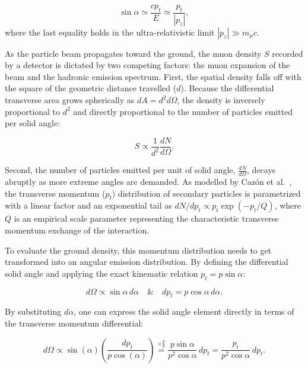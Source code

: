 \documentclass[11pt,a4paper]{article}
\begin{document}
\begin{equation}
    \sin \alpha \simeq \frac{c p_t}{E} \simeq \frac{p_t}{|p_z|},
    \label{eq:cazon_alpha}
\end{equation}
%
where the last equality holds in the ultra-relativistic limit $|p_z| \gg m_\mu c$.

As the particle beam propagates toward the ground, the muon density $S$ recorded by a detector is dictated by two competing factors: the muon expansion of the beam and the hadronic emission spectrum. First, the spatial density falls off with the square of the geometric distance travelled ($d$). Because the differential transverse area grows spherically as $dA = d^2 d\Omega$, the density is inversely proportional to $d^2$ and directly proportional to the number of particles emitted per solid angle:

\begin{equation}
    S \propto \frac{1}{d^2} \frac{dN}{d\Omega}.
\end{equation}

Second, the number of particles emitted per unit of solid angle, $\frac{dN}{d\Omega}$, decays abruptly as more extreme angles are demanded. As modelled by Cazón et al.~\cite{Cazon2012}, the transverse momentum ($p_t$) distribution of secondary particles is parametrized with a linear factor and an exponential tail as $dN/dp_t \propto p_t \exp(-p_t/Q)$, where $Q$ is an empirical scale parameter representing the characteristic transverse momentum exchange of the interaction.

To evaluate the ground density, this momentum distribution needs to get transformed into an angular emission distribution. By defining the differential solid angle and applying the exact kinematic relation $p_t = p \sin\alpha$:

\begin{equation}
    d\Omega \propto \sin\alpha \, d\alpha \quad \& \quad dp_t = p \cos\alpha \, d\alpha.
    \nonumber
\end{equation}

By substituting $d\alpha$, one can express the solid angle element directly in terms of the transverse momentum differential:

\begin{equation}
    d\Omega \propto \sin(\alpha)\left(\frac{dp_t}{p\cos(\alpha)}\right) \overset{\times \frac{p}{p}}{=} \frac{p \sin\alpha}{p^2 \cos\alpha} \, dp_t = \frac{p_t}{p^2 \cos\alpha} \, dp_t.
\end{equation}
\end{document}
